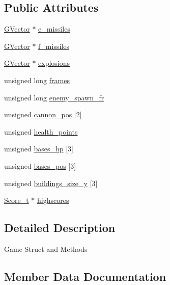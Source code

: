 \subsection*{Public Attributes}
\begin{DoxyCompactItemize}
\item 
\hyperlink{group___g_vector_ga6d90d5e6b721779a43354f2752b79281}{G\+Vector} $\ast$ \hyperlink{struct_game__t_a30c32876ba91964b9b7083ef244815e9}{e\+\_\+missiles}
\item 
\hyperlink{group___g_vector_ga6d90d5e6b721779a43354f2752b79281}{G\+Vector} $\ast$ \hyperlink{struct_game__t_a9aea8f7d5e9730e64878d220814cf5ee}{f\+\_\+missiles}
\item 
\hyperlink{group___g_vector_ga6d90d5e6b721779a43354f2752b79281}{G\+Vector} $\ast$ \hyperlink{struct_game__t_a14d975d4e5ce1bf613317321e5d43029}{explosions}
\item 
unsigned long \hyperlink{struct_game__t_af4d5f8a155f90b1f37e63d35db44734a}{frames}
\item 
unsigned long \hyperlink{struct_game__t_a2208b5a6b7e8ad55bd0f4e09730d9599}{enemy\+\_\+spawn\+\_\+fr}
\item 
unsigned \hyperlink{struct_game__t_a3d8925453d2141ee634a3bb32e7fc4bf}{cannon\+\_\+pos} \mbox{[}2\mbox{]}
\item 
unsigned \hyperlink{struct_game__t_a172b6aea1411a491f1b6fba4ae7b802b}{health\+\_\+points}
\item 
unsigned \hyperlink{struct_game__t_a210bd36fda417d2fc1356e7f0242c6a2}{bases\+\_\+hp} \mbox{[}3\mbox{]}
\item 
unsigned \hyperlink{struct_game__t_aa3465afd0a5082a9b40aec2f6643bf4a}{bases\+\_\+pos} \mbox{[}3\mbox{]}
\item 
unsigned \hyperlink{struct_game__t_a9cc316346c6e425c84857c694adaedb2}{buildings\+\_\+size\+\_\+y} \mbox{[}3\mbox{]}
\item 
\hyperlink{struct_score__t}{Score\+\_\+t} $\ast$ \hyperlink{struct_game__t_a375852aa9a12c33759d6ab7784fa7314}{highscores}
\end{DoxyCompactItemize}


\subsection{Detailed Description}
Game Struct and Methods 

\subsection{Member Data Documentation}
\hypertarget{struct_game__t_a210bd36fda417d2fc1356e7f0242c6a2}{}\label{struct_game__t_a210bd36fda417d2fc1356e7f0242c6a2} 
